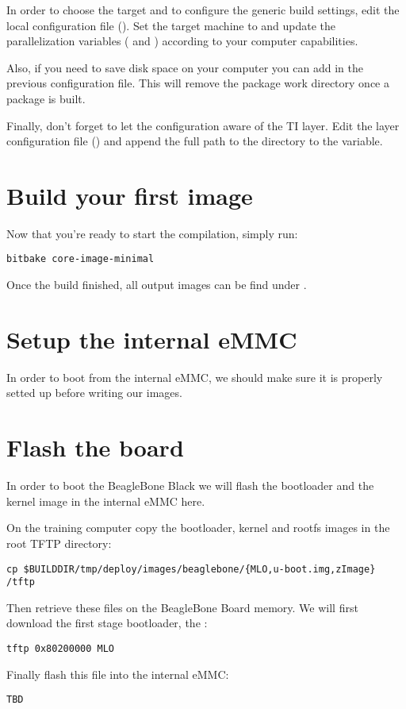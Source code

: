 In order to choose the target and to configure the generic build settings,
edit the local configuration file (). Set
the target machine to  and update the parallelization variables
( and ) according to your computer
capabilities.

Also, if you need to save disk space on your computer you can add  in the previous configuration file. This will remove the
package work directory once a package is built.

Finally, don't forget to let the configuration aware of the TI layer. Edit the
layer configuration file () and append the
full path to the  directory to the  variable.

\section{Build your first image}

Now that you're ready to start the compilation, simply run:
\begin{verbatim}
bitbake core-image-minimal
\end{verbatim}

Once the build finished, all output images can be find under
.

\section{Setup the internal eMMC}

In order to boot from the internal eMMC, we should make sure it is properly
setted up before writing our images.

\section{Flash the board}

In order to boot the BeagleBone Black we will flash the bootloader and the
kernel image in the internal eMMC here.

On the training computer copy the bootloader, kernel and rootfs images in the
root TFTP directory:
\begin{verbatim}
cp $BUILDDIR/tmp/deploy/images/beaglebone/{MLO,u-boot.img,zImage} /tftp
\end{verbatim}

Then retrieve these files on the BeagleBone Board memory. We will first download
the first stage bootloader, the :
\begin{verbatim}
tftp 0x80200000 MLO
\end{verbatim}

Finally flash this file into the internal eMMC:
\begin{verbatim}
TBD
\end{verbatim}
